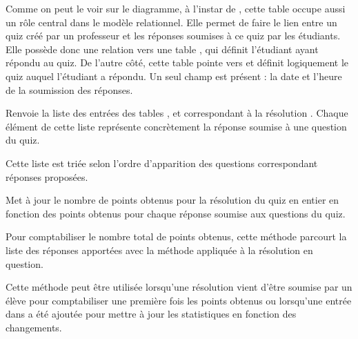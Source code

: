 \documentclass[a4paper,11pt,openany,oneside]{sphinxmanual}
\begin{document}

\begin{fulllineitems}
\label{database:quiz.models.CompletedQuiz}
Comme on peut le voir sur le diagramme, à l'instar de , cette table
occupe aussi un rôle central dans le modèle relationnel. Elle permet de faire
le lien entre un quiz créé par un professeur et les réponses soumises à ce quiz
par les étudiants. Elle possède donc une relation vers une table ,
qui définit l'étudiant ayant répondu au quiz. De l'autre côté, cette table pointe
vers  et définit logiquement le quiz auquel l'étudiant a répondu. Un seul
champ est présent : la date et l'heure de la soumission des réponses.

\begin{fulllineitems}
\label{database:quiz.models.CompletedQuiz.get_questions_submits}
Renvoie la liste des entrées des tables ,  et
 correspondant à la résolution .
Chaque élément de cette liste représente concrètement la réponse soumise à
une question du quiz.

Cette liste est triée selon l'ordre d'apparition des questions correspondant
réponses proposées.

\end{fulllineitems}


\begin{fulllineitems}
\label{database:quiz.models.CompletedQuiz.update_total_result}
Met à jour le nombre de points obtenus pour la résolution du quiz en entier
en fonction des points obtenus pour chaque réponse soumise aux questions
du quiz.

Pour comptabiliser le nombre total de points obtenus, cette méthode parcourt
la liste des réponses apportées avec la méthode 
appliquée à la résolution en question.

Cette méthode peut être utilisée lorsqu'une résolution vient d'être soumise
par un élève pour comptabiliser une première fois les points obtenus ou 
lorsqu'une entrée dans  a été ajoutée pour mettre à jour les
statistiques en fonction des changements.

\end{fulllineitems}


\end{fulllineitems}
\end{document}
